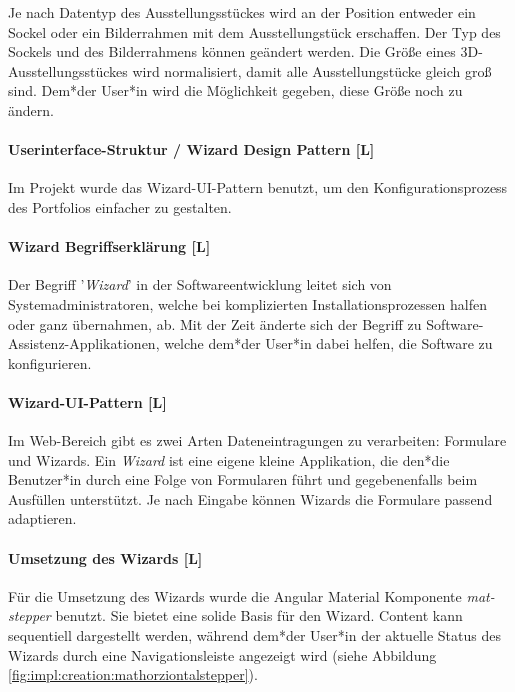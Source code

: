 Je nach Datentyp des Ausstellungsstückes wird an der Position entweder ein Sockel oder ein Bilderrahmen mit dem Ausstellungstück erschaffen. Der Typ des Sockels und des Bilderrahmens können geändert werden.
Die Größe eines 3D-Ausstellungsstückes wird normalisiert, damit alle Ausstellungstücke gleich groß sind. Dem*der User*in wird die Möglichkeit gegeben, diese Größe noch zu ändern.

\paragraph{Userinterface-Struktur / Wizard Design Pattern [L]}
\label{sec::contentcreation::wizard}
Im Projekt wurde das Wizard-UI-Pattern benutzt, um den Konfigurationsprozess des Portfolios einfacher zu gestalten.

\paragraph*{Wizard Begriffserklärung [L]}
Der Begriff '\emph{Wizard}' in der Softwareentwicklung leitet sich von Systemadministratoren, welche bei komplizierten Installationsprozessen halfen oder ganz übernahmen, ab. Mit der Zeit änderte sich der Begriff zu Software-Assistenz-Applikationen, welche dem*der User*in dabei helfen, die Software zu konfigurieren. \cite[Ursprung des Begriffs Wizard]{OrigionOfWizards}

\paragraph{Wizard-UI-Pattern [L]}
Im Web-Bereich gibt es zwei Arten Dateneintragungen zu verarbeiten: Formulare und Wizards. 
Ein \emph{Wizard} ist eine eigene kleine Applikation, die den*die Benutzer*in durch eine Folge von Formularen führt und gegebenenfalls beim Ausfüllen unterstützt. Je nach Eingabe können Wizards die Formulare passend adaptieren.\cite[Wizards: Definition and Design Recommendations]{WizradsDefinitionAndRecommandation}

\paragraph{Umsetzung des Wizards [L]}
Für die Umsetzung des Wizards wurde die Angular Material Komponente \emph{mat-stepper} benutzt. Sie bietet eine solide Basis für den Wizard. Content kann sequentiell dargestellt werden, während dem*der User*in der aktuelle Status des Wizards durch eine Navigationsleiste angezeigt wird (siehe Abbildung \ref{fig:impl:creation:mathorziontalstepper}). \cite{amStepper}

